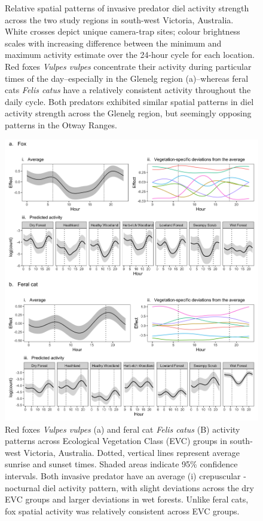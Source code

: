 \documentclass[11pt,a4paper,titlepage,twoside,openright]{style/unimelbthesis}
\begin{document}
\begin{mainmatter}
\begin{figure}
{}

\caption{Relative spatial patterns of invasive predator diel activity strength across the two study regions in south-west Victoria, Australia. White crosses depict unique camera-trap sites; colour brightness scales with increasing difference between the minimum and maximum activity estimate over the 24-hour cycle for each location. Red foxes \textit{Vulpes vulpes} concentrate their activity during particular times of the day--especially in the Glenelg region (a)--whereas feral cats \textit{Felis catus} have a relatively consistent activity throughout the daily cycle. Both predators exhibited similar spatial patterns in diel activity strength across the Glenelg region, but seemingly opposing patterns in the Otway Ranges.}\label{fig:diel-space}
\end{figure}
\newpage
\begin{figure}

{\centering \includegraphics[width=1\linewidth]{figure/c4/predator_veg} 

}

\caption{Red foxes \textit{Vulpes vulpes} (a) and feral cat \textit{Felis catus} (B) activity patterns across Ecological Vegetation Class (EVC) groups in south-west Victoria, Australia. Dotted, vertical lines represent average sunrise and sunset times. Shaded areas indicate 95\% confidence intervals. Both invasive predator have an average (i) crepuscular - nocturnal diel activity pattern, with slight deviations across the dry EVC groups and larger deviations in wet forests. Unlike feral cats, fox spatial activity was relatively consistent across EVC groups.}\label{fig:diel-veg}
\end{figure}
\newpage
\begin{figure}


\end{figure}
\end{mainmatter}
\end{document}
